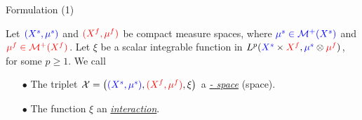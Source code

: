 \documentclass{beamer}
\newcommand{\cX}{\mathcal X}
\newcommand{\cM}{\mathcal M}
\newcommand{\sfspace}{{\color{blue}{s.}}{\color{red}{f. }}}
\begin{document}
\begin{frame}{Formulation (1)}
\scriptsize
  \begin{definition}
    Let ${\color{blue}{(X^s, \mu^s)}}$ and ${\color{red}{(X^f, \mu^f)}}$ be compact measure spaces, where ${\color{blue}{\mu^s \in \cM^+(X^s)}}$ and ${\color{red}{\mu^f \in \cM^+(X^f)}}$. Let $\xi$ be a scalar integrable function in $L^p({\color{blue}{X^s}} \times {\color{red}{X^f}}, {\color{blue}{\mu^s}} \otimes {\color{red}{\mu^f}})$, for some $p \geq 1$. We call
    \begin{itemize}
      \setlength\itemindent{10pt}
      \item[$\bullet$] The triplet
      $\cX = \left({\color{blue}{(X^s, \mu^s)}}, {\color{red}{(X^f, \mu^f)}}, \xi \right)$
      a \underline{\textit{{\color{blue}{sample}} - {\color{red}{feature}} space}}
      (\sfspace space).

      \item[$\bullet$] The function $\xi$ an \textit{\underline{interaction}}.
    \end{itemize}
  \end{definition}
  \vspace{-0.2cm}



\end{frame}
\end{document}
